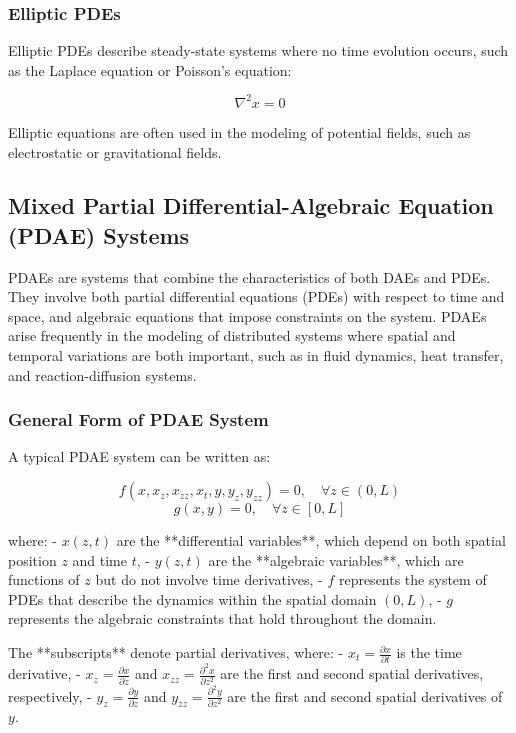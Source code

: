 \documentclass{article}
\begin{document}
\subsubsection{Elliptic PDEs}

Elliptic PDEs describe steady-state systems where no time evolution occurs, such as the Laplace equation or Poisson's equation:

\[
\nabla^2 x = 0
\]

Elliptic equations are often used in the modeling of potential fields, such as electrostatic or gravitational fields.

\subsection{Mixed Partial Differential-Algebraic Equation (PDAE) Systems}

PDAEs are systems that combine the characteristics of both DAEs and PDEs. They involve both partial differential equations (PDEs) with respect to time and space, and algebraic equations that impose constraints on the system. PDAEs arise frequently in the modeling of distributed systems where spatial and temporal variations are both important, such as in fluid dynamics, heat transfer, and reaction-diffusion systems.

\subsubsection{General Form of PDAE System}

A typical PDAE system can be written as:

\[
f(x, x_z, x_{zz}, x_t, y, y_z, y_{zz}) = 0, \quad \forall z \in (0, L)
\]
\[
g(x, y) = 0, \quad \forall z \in [0, L]
\]

where:
- \(x(z,t)\) are the **differential variables**, which depend on both spatial position \(z\) and time \(t\),
- \(y(z,t)\) are the **algebraic variables**, which are functions of \(z\) but do not involve time derivatives,
- \(f\) represents the system of PDEs that describe the dynamics within the spatial domain \((0, L)\),
- \(g\) represents the algebraic constraints that hold throughout the domain.

The **subscripts** denote partial derivatives, where:
- \(x_t = \frac{\partial x}{\partial t}\) is the time derivative,
- \(x_z = \frac{\partial x}{\partial z}\) and \(x_{zz} = \frac{\partial^2 x}{\partial z^2}\) are the first and second spatial derivatives, respectively,
- \(y_z = \frac{\partial y}{\partial z}\) and \(y_{zz} = \frac{\partial^2 y}{\partial z^2}\) are the first and second spatial derivatives of \(y\).
\end{document}
